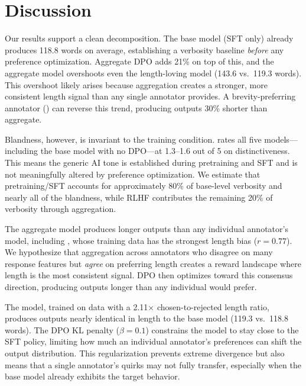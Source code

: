 \section{Discussion}
\label{sec:discussion}

Our results support a clean decomposition. The base model (SFT only) already produces 118.8 words on average, establishing a verbosity baseline \emph{before} any preference optimization. Aggregate DPO adds 21\% on top of this, and the aggregate model overshoots even the length-loving \gemma model (143.6 vs.\ 119.3 words). This overshoot likely arises because aggregation creates a stronger, more consistent length signal than any single annotator provides. A brevity-preferring annotator (\beaver) can reverse this trend, producing outputs 30\% shorter than aggregate.

Blandness, however, is invariant to the training condition. \gptjudge rates all five models---including the base model with no DPO---at 1.3--1.6 out of 5 on distinctiveness. This means the generic AI tone is established during pretraining and SFT and is not meaningfully altered by preference optimization. We estimate that pretraining/SFT accounts for approximately 80\% of base-level verbosity and nearly all of the blandness, while RLHF contributes the remaining 20\% of verbosity through aggregation.

The aggregate model produces longer outputs than any individual annotator's model, including \gemma, whose training data has the strongest length bias ($r{=}0.77$). We hypothesize that aggregation across annotators who disagree on many response features but \emph{agree} on preferring length creates a reward landscape where length is the most consistent signal. DPO then optimizes toward this consensus direction, producing outputs longer than any individual would prefer.

The \gemma model, trained on data with a 2.11$\times$ chosen-to-rejected length ratio, produces outputs nearly identical in length to the base model (119.3 vs.\ 118.8 words). The DPO KL penalty ($\beta{=}0.1$) constrains the model to stay close to the SFT policy, limiting how much an individual annotator's preferences can shift the output distribution. This regularization prevents extreme divergence but also means that a single annotator's quirks may not fully transfer, especially when the base model already exhibits the target behavior.

